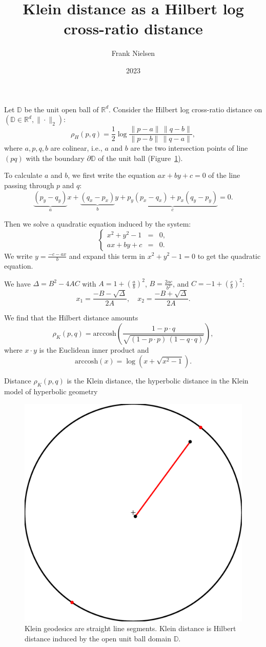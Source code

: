 \documentclass{article}
\title{Klein distance as a Hilbert log cross-ratio distance}
\author{Frank Nielsen}
\date{2023}
\def\bbD{\mathbb{D}}
\def\bbR{\mathbb{R}}
\def\arccosh{\mathrm{arccosh}}
\begin{document}
\maketitle

Let $\bbD$ be the unit open ball of $\bbR^d$.
Consider the Hilbert log cross-ratio distance on $(\bbD\in\bbR^d,\|\cdot\|_2)$:
\begin{equation}\label{eq:H}
\rho_H(p,q)=\frac{1}{2}\log \frac{\|p-a\|\, \|q-b\|}{\|p-b\| \, \|q-a\| },
\end{equation}
where $a,p,q,b$ are colinear, i.e., $a$ and $b$ are the two intersection points of line $(pq)$ with the boundary $\partial\bbD$ of the unit ball (Figure~\ref{fig:kg}).

To calculate $a$ and $b$, we first write the equation $ax+by+c=0$ of the line passing through $p$ and $q$:
$$
\underbrace{(p_y-q_y)}_{a}x+\underbrace{(q_x-p_x)}_{b}y+\underbrace{p_y(p_x-q_x)+p_x(q_y-p_y)}_{c}=0.
$$

Then we solve a quadratic equation induced by the system:
$$
\left\{\begin{array}{lll}
x^2+y^2 -1 &=& 0,\\
ax+by+c &=& 0.
\end{array}
\right.
$$
We write $y=\frac{-c-ax}{b}$ and expand this term in $x^2+y^2 -1=0$ to get the quadratic equation.

We have $\Delta=B^2-4AC$ with $A=1+\left(\frac{a}{b}\right)^2$, $B=\frac{2ac}{b^2}$, and $C=-1+\left(\frac{c}{b}\right)^2$:
$$
x_1=\frac{-B-\sqrt{\Delta}}{2A}, \quad x_2=\frac{-B+\sqrt{\Delta}}{2A}.
$$

We find that the Hilbert distance amounts
$$
\rho_K(p,q)=\arccosh\left( \frac{1-p\cdot q}{\sqrt{(1-p\cdot p)\, (1-q\cdot q)}}\right),
$$
where $x\cdot y$ is the Euclidean inner product and
$$
\arccosh(x)=\log(x+\sqrt{x^2-1}).
$$

Distance $\rho_K(p,q)$ is the Klein distance, the hyperbolic distance in the Klein model of hyperbolic geometry 
 

\begin{figure}%
\includegraphics[width=\columnwidth]{Fig-KleinGeodesic.pdf}%
\caption{Klein geodesics are straight line segments. Klein distance is Hilbert distance induced by the open unit ball domain $\bbD$.}%
\label{fig:kg}%
\end{figure}
	
\end{document}
